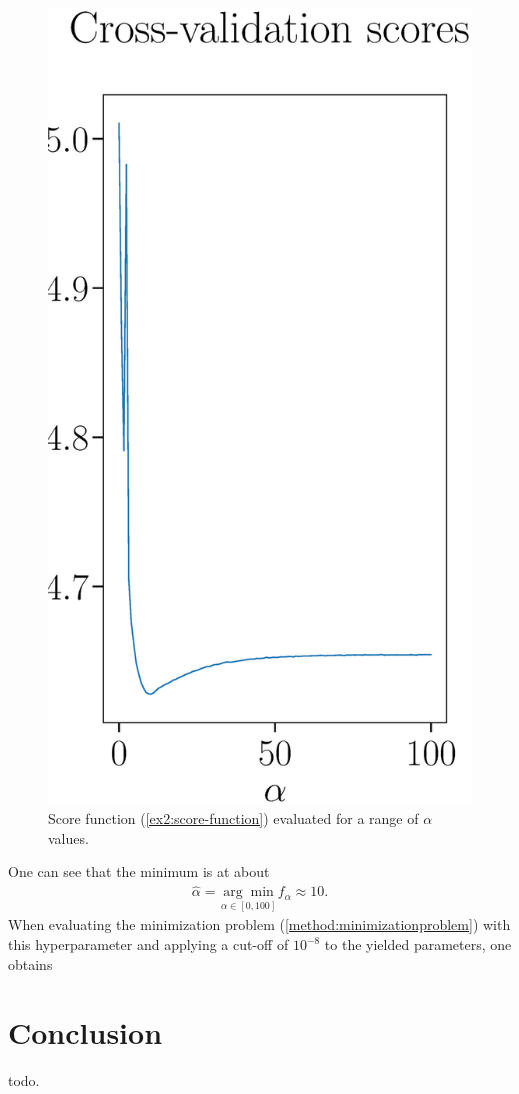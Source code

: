 \documentclass[oneside, abstracton, titlepage]{scrartcl}
\begin{document}
	\begin{figure}
		\begin{center}
			\includegraphics[width=.5\textwidth]{./figures_tex/cv_score}
		\end{center}
		\caption{Score function (\ref{ex2:score-function}) evaluated for a range of $\alpha$ values.}
		\label{ex2:score-graph}
	\end{figure}

	One can see that the minimum is at about
	\begin{align}
		\hat{\alpha} = \underset{\alpha\in[0,100]}{\arg\min}f_\alpha\approx 10.
	\end{align}
	When evaluating the minimization problem (\ref{method:minimizationproblem}) with this hyperparameter and applying a cut-off of $10^{-8}$ to the yielded parameters, one obtains
	
	\section{Conclusion}
	todo.
	
	
	\newpage
% 	
	
	
	
\end{document}
